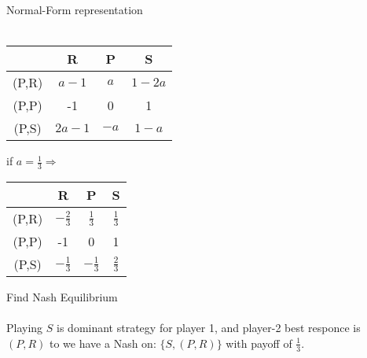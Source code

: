 \documentclass[
  course = {{IE579 Game Theory and Multi-Agent Reinforcement Learning}},
  quartile = {{4}},
  assignment = 2,
  name = {{Mohammad Mahdi Rahimi}},
  studentnumber = {{20208244}},
  email = {{mahi@kaist.ac.kr}},
  firstexercise = 1
]{aga-homework}
\begin{document}
\subexercise Normal-Form representation
\\\\
\begin{center}
\begin{tabular}{ |c|c|c|c| } 
\hline 
 & R & P & S \\
\hline
(P,R) & $a - 1$ & $a$ & $1 - 2a$ \\ 
\hline
(P,P) & -1 & 0 & 1 \\ 
\hline
(P,S) & $2a - 1$ & $-a$ & $1 - a$ \\ 
\hline
\end{tabular}   if $a = \frac{1}{3} \Rightarrow$
\begin{tabular}{ |c|c|c|c| } 
\hline 
 & R & P & S \\
\hline
(P,R) & $-\frac{2}{3}$ & $\frac{1}{3}$ & $\frac{1}{3}$ \\ 
\hline
(P,P) & -1 & 0 & 1 \\ 
\hline
(P,S) & $-\frac{1}{3}$ & $-\frac{1}{3}$ & $\frac{2}{3}$ \\ 
\hline
\end{tabular}    
\end{center}

\subexercise Find Nash Equilibrium
\\\\
Playing $S$ is dominant strategy for player 1, and player-2 best responce is $(P,R)$ to we have a Nash on: $\{S, (P,R)\}$ with payoff of $\frac{1}{3}$.
\end{document}
